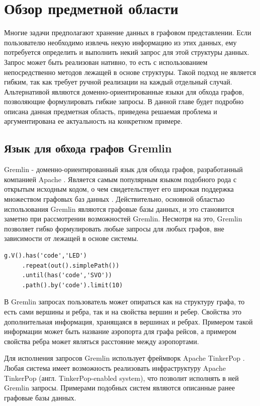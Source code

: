 \documentclass[times,specification,annotation]{itmo-student-thesis}
\begin{document}
\chapter{Обзор предметной области}

\startrelatedwork
Многие задачи предполагают хранение данных в графовом представлении. Если пользователю необходимо извлечь некую информацию из этих данных, ему потребуется определить и выполнить некий запрос для этой структуры данных. Запрос может быть реализован нативно, то есть с использованием непосредственно методов лежащей в основе структуры. Такой подход не является гибким, так как требует ручной реализации на каждый отдельный случай. Альтернативой являются доменно-ориентированные языки для обхода графов, позволяющие формулировать гибкие запросы. В данной главе будет подробно описана данная предметная область, приведена решаемая проблема и аргументирована ее актуальность на конкретном примере.

\section{Язык для обхода графов Gremlin}

Gremlin - доменно-ориентированный язык для обхода графов, разработанный компанией Apache \cite{gremlin}. Является самым популярным языком подобного рода с открытым исходным кодом, о чем свидетельствует его широкая поддержка множеством графовых баз данных \cite{tinkerpop-enabled}. Действительно, основной областью использования Gremlin являются графовые базы данных, и это становится заметно при рассмотрении возможностей Gremlin. Несмотря на это, Gremlin позволяет гибко формулировать любые запросы для любых графов, вне зависимости от лежащей в основе системы.

\begin{lstlisting}[float=!h,caption={Пример запроса на Gremlin},label={lst1}]
g.V().has('code','LED')
     .repeat(out().simplePath())
     .until(has('code','SVO'))
     .path().by('code').limit(10)
\end{lstlisting}

В Gremlin запросах пользователь может опираться как на структуру графа, то есть сами вершины и ребра, так и на свойства вершин и ребер. Свойства это дополнительная информация, хранящаяся в вершинах и ребрах. Примером такой информации может быть название аэропорта для графа рейсов, а примером свойства ребра может являться расстояние между аэропортами. 

Для исполнения запросов Gremlin использует фреймворк Apache TinkerPop \cite{tinkerpop}. Любая система имеет возможность реализовать инфраструктуру Apache TinkerPop (англ. TinkerPop-enabled system), что позволит исполнять в ней Gremlin запросы. Примерами подобных систем являются описанные ранее графовые базы данных.
\end{document}
